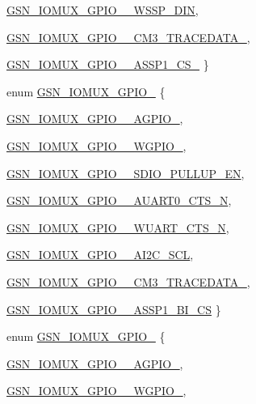 \begin{DoxyCompactItemize}
\hyperlink{a00519_a70a451f18789dc2260867a28da10688cacf6959745f3fe630e52a38d9d47b66ae}{GSN\_\-IOMUX\_\-GPIO\_\_\-WSSP\_\-DIN}, 
\par
\hyperlink{a00519_a70a451f18789dc2260867a28da10688ca0f282fc5bbfa49dcdb54ee5d8cdbd763}{GSN\_\-IOMUX\_\-GPIO\_\_\-CM3\_\-TRACEDATA\_}, 
\par
\hyperlink{a00519_a70a451f18789dc2260867a28da10688ca96defbab76aeeba609725c4813131d05}{GSN\_\-IOMUX\_\-GPIO\_\_\-ASSP1\_\-CS\_}
 \}
\item 
enum \hyperlink{a00519_a2c5811def165aa4bef261dac58a7ae08}{GSN\_\-IOMUX\_\-GPIO\_} \{ \par
\hyperlink{a00519_a2c5811def165aa4bef261dac58a7ae08ac4bd197666f0c4dff03698c575defd23}{GSN\_\-IOMUX\_\-GPIO\_\_\-AGPIO\_}, 
\par
\hyperlink{a00519_a2c5811def165aa4bef261dac58a7ae08a4748af71663e69e63b216765f1c7f122}{GSN\_\-IOMUX\_\-GPIO\_\_\-WGPIO\_}, 
\par
\hyperlink{a00519_a2c5811def165aa4bef261dac58a7ae08a5041ee6830c64d791591022850533870}{GSN\_\-IOMUX\_\-GPIO\_\_\-SDIO\_\-PULLUP\_\-EN}, 
\par
\hyperlink{a00519_a2c5811def165aa4bef261dac58a7ae08a3bd95254c030051cf16331bdf3f9d453}{GSN\_\-IOMUX\_\-GPIO\_\_\-AUART0\_\-CTS\_\-N}, 
\par
\hyperlink{a00519_a2c5811def165aa4bef261dac58a7ae08afa20823c4a91f395588861af9b720b81}{GSN\_\-IOMUX\_\-GPIO\_\_\-WUART\_\-CTS\_\-N}, 
\par
\hyperlink{a00519_a2c5811def165aa4bef261dac58a7ae08af9b0dbb8cd55283fb5882950205b8839}{GSN\_\-IOMUX\_\-GPIO\_\_\-AI2C\_\-SCL}, 
\par
\hyperlink{a00519_a2c5811def165aa4bef261dac58a7ae08aa56c6885dbc72fac55ad4fc80d3a5749}{GSN\_\-IOMUX\_\-GPIO\_\_\-CM3\_\-TRACEDATA\_}, 
\par
\hyperlink{a00519_a2c5811def165aa4bef261dac58a7ae08a63ccca86d2598a7d23a305ea50cc187b}{GSN\_\-IOMUX\_\-GPIO\_\_\-ASSP1\_\-BI\_\-CS}
 \}
\item 
enum \hyperlink{a00519_ad659954601e98e1c08044b2365c23e49}{GSN\_\-IOMUX\_\-GPIO\_} \{ \par
\hyperlink{a00519_ad659954601e98e1c08044b2365c23e49a3b74939fd27b9ae505e493ba89f9344f}{GSN\_\-IOMUX\_\-GPIO\_\_\-AGPIO\_}, 
\par
\hyperlink{a00519_ad659954601e98e1c08044b2365c23e49ad623e05140757f4b455040cd0179307f}{GSN\_\-IOMUX\_\-GPIO\_\_\-WGPIO\_}, 
\par

\end{DoxyCompactItemize}
